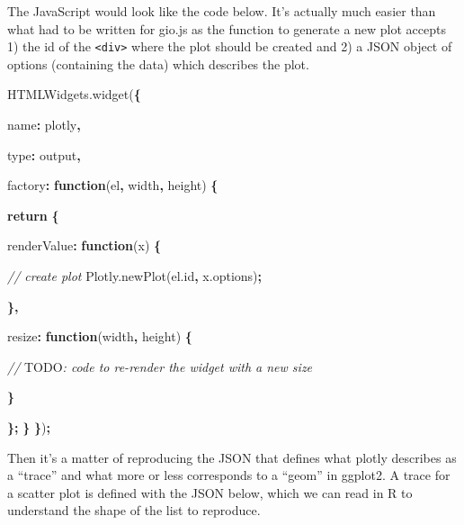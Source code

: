 \documentclass[
]{krantz}
\makeatletter
\newenvironment{Shaded}{\begin{snugshade}}{\end{snugshade}}
\newcommand{\AlertTok}[1]{\textcolor[rgb]{0.33,0.33,0.33}{#1}}
\newcommand{\AttributeTok}[1]{\textcolor[rgb]{0.61,0.61,0.61}{#1}}
\newcommand{\CommentTok}[1]{\textcolor[rgb]{0.37,0.37,0.37}{\textit{#1}}}
\newcommand{\ControlFlowTok}[1]{\textcolor[rgb]{0.27,0.27,0.27}{\textbf{#1}}}
\newcommand{\DataTypeTok}[1]{\textcolor[rgb]{0.27,0.27,0.27}{#1}}
\newcommand{\KeywordTok}[1]{\textcolor[rgb]{0.27,0.27,0.27}{\textbf{#1}}}
\newcommand{\NormalTok}[1]{#1}
\newcommand{\OperatorTok}[1]{\textcolor[rgb]{0.43,0.43,0.43}{\textbf{#1}}}
\newcommand{\StringTok}[1]{\textcolor[rgb]{0.5,0.5,0.5}{#1}}
\newcommand{\VariableTok}[1]{\textcolor[rgb]{0,0,0}{#1}}
\newenvironment{kframe}{%
\medskip{}
\setlength{\fboxsep}{.8em}
 \def\at@end@of@kframe{}%
 \ifinner\ifhmode%
  \def\at@end@of@kframe{\end{minipage}}%
  \begin{minipage}{\columnwidth}%
 \fi\fi%
 \def\FrameCommand##1{\hskip\@totalleftmargin \hskip-\fboxsep
 \colorbox{shadecolor}{##1}\hskip-\fboxsep
     \hskip-\linewidth \hskip-\@totalleftmargin \hskip\columnwidth}%
 \MakeFramed {\advance\hsize-\width
   \@totalleftmargin\z@ \linewidth\hsize
   \@setminipage}}%
 {\par\unskip\endMakeFramed%
 \at@end@of@kframe}
\renewenvironment{Shaded}{\begin{kframe}}{\end{kframe}}
\makeatother
\begin{document}
The JavaScript would look like the code below. It's actually much easier than what had to be written for gio.js as the function to generate a new plot accepts 1) the id of the \texttt{\textless{}div\textgreater{}} where the plot should be created and 2) a JSON object of options (containing the data) which describes the plot.

\begin{Shaded}
\begin{Highlighting}[]
\VariableTok{HTMLWidgets}\NormalTok{.}\AttributeTok{widget}\NormalTok{(}\OperatorTok{\{}

  \DataTypeTok{name}\OperatorTok{:} \StringTok{\textquotesingle{}plotly\textquotesingle{}}\OperatorTok{,}

  \DataTypeTok{type}\OperatorTok{:} \StringTok{\textquotesingle{}output\textquotesingle{}}\OperatorTok{,}

  \DataTypeTok{factory}\OperatorTok{:} \KeywordTok{function}\NormalTok{(el}\OperatorTok{,}\NormalTok{ width}\OperatorTok{,}\NormalTok{ height) }\OperatorTok{\{}

    \ControlFlowTok{return} \OperatorTok{\{}

      \DataTypeTok{renderValue}\OperatorTok{:} \KeywordTok{function}\NormalTok{(x) }\OperatorTok{\{}

        \CommentTok{// create plot}
        \VariableTok{Plotly}\NormalTok{.}\AttributeTok{newPlot}\NormalTok{(}\VariableTok{el}\NormalTok{.}\AttributeTok{id}\OperatorTok{,} \VariableTok{x}\NormalTok{.}\AttributeTok{options}\NormalTok{)}\OperatorTok{;}

      \OperatorTok{\},}

      \DataTypeTok{resize}\OperatorTok{:} \KeywordTok{function}\NormalTok{(width}\OperatorTok{,}\NormalTok{ height) }\OperatorTok{\{}

        \CommentTok{// }\AlertTok{TODO}\CommentTok{: code to re{-}render the widget with a new size}

      \OperatorTok{\}}

    \OperatorTok{\};}
  \OperatorTok{\}}
\OperatorTok{\}}\NormalTok{)}\OperatorTok{;}
\end{Highlighting}
\end{Shaded}

Then it's a matter of reproducing the JSON that defines what plotly describes as a ``trace'' and what more or less corresponds to a ``geom'' in ggplot2. A trace for a scatter plot is defined with the JSON below, which we can read in R to understand the shape of the list to reproduce.
\end{document}

